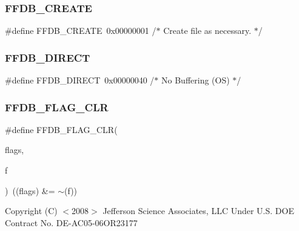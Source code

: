 \mbox{\label{adat-devel_2other__libs_2filedb_2filehash_2ffdb__pagepool_8h_ac275e89e5a9d7918449b3fb9d2b57c7d}} 
\subsubsection{\texorpdfstring{FFDB\_CREATE}{FFDB\_CREATE}}
{\footnotesize\ttfamily \#define F\+F\+D\+B\+\_\+\+C\+R\+E\+A\+TE~0x00000001    /$\ast$ Create file as necessary. $\ast$/}

\mbox{\label{adat-devel_2other__libs_2filedb_2filehash_2ffdb__pagepool_8h_a0752e3ac79c56657fcddc9ec8b113664}} 
\subsubsection{\texorpdfstring{FFDB\_DIRECT}{FFDB\_DIRECT}}
{\footnotesize\ttfamily \#define F\+F\+D\+B\+\_\+\+D\+I\+R\+E\+CT~0x00000040    /$\ast$ No Buffering (\+O\+S)  $\ast$/}

\mbox{\label{adat-devel_2other__libs_2filedb_2filehash_2ffdb__pagepool_8h_ab474411c6606124ac96464e49450491b}} 
\subsubsection{\texorpdfstring{FFDB\_FLAG\_CLR}{FFDB\_FLAG\_CLR}}
{\footnotesize\ttfamily \#define F\+F\+D\+B\+\_\+\+F\+L\+A\+G\+\_\+\+C\+LR(\begin{DoxyParamCaption}\item[{}]{flags,  }\item[{}]{f }\end{DoxyParamCaption})~((flags) \&= $\sim$(f))}

Copyright (C) $<$2008$>$ Jefferson Science Associates, L\+LC Under U.\+S. D\+OE Contract No. D\+E-\/\+A\+C05-\/06\+O\+R23177

